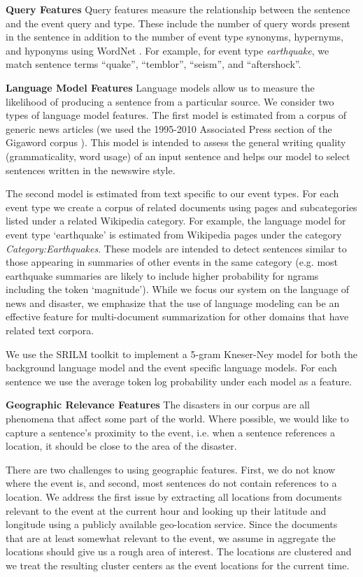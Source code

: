 \textbf{Query Features}
Query features measure the relationship between the sentence and the event 
query and type.  These include the number of query words present in the 
sentence in addition to the number of event type synonyms, hypernyms, and 
hyponyms using WordNet \cite{miller1995wordnet}.  For example, for event type 
\emph{earthquake},  we match sentence terms ``quake'', ``temblor'', ``seism'',
and ``aftershock''.


\textbf{Language Model Features}\label{subsubsec:lm}
Language models allow us to measure the likelihood of producing a sentence 
from a particular source.  We consider two types of language model features.  
The first model is estimated from a corpus of generic news articles (we used 
the 1995-2010 Associated Press section of the Gigaword corpus 
\cite{graff2003english}).  
This model is intended to assess the general writing quality (grammaticality, 
word usage) of an input sentence and helps our model to select sentences
written in the newswire style.  


The second model is estimated from text specific to our event types.  For each
event type we create a corpus of related documents using pages and 
subcategories listed under a related Wikipedia category. For example, the 
language model for event type `earthquake' is estimated from Wikipedia pages 
under the category \emph{Category:Earthquakes}.  These models are intended to 
detect sentences similar to those appearing in summaries of other events in 
the same category (e.g. most earthquake summaries are likely to include 
higher probability for ngrams including the token `magnitude'). While we focus
our system on the language of news and disaster, we emphasize that the use of 
language modeling can be an effective feature for multi-document summarization
for other domains that have related text corpora.


We use the SRILM toolkit \cite{stolcke2002srilm} to implement a 5-gram 
Kneser-Ney model for both the background language model and the event specific
language models. For each sentence we use the average token log probability 
under each model as a feature.


\textbf{Geographic Relevance Features}
The disasters in our corpus are all phenomena that affect some part of the 
world. Where possible, we would like to capture a sentence's proximity to the 
event, i.e. when a sentence references a location, it should be close to the 
area of the disaster. 


There are two challenges to using geographic features. First, we do not know 
where the event is, and second, most sentences do not contain references to a 
location. We address the first issue by extracting all locations from 
documents relevant to the event at the current hour and looking up their 
latitude and longitude using a publicly available geo-location service. 
Since the documents that are at least somewhat relevant to the event, we 
assume in aggregate the locations should give us a rough area of interest.
The locations are clustered and we treat the resulting cluster centers as the 
event locations for the current time.


